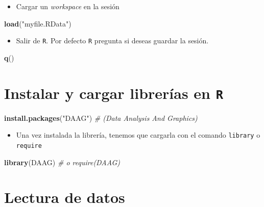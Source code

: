\documentclass[]{book}
\newenvironment{Shaded}{\begin{snugshade}}{\end{snugshade}}
\newcommand{\KeywordTok}[1]{\textcolor[rgb]{0.13,0.29,0.53}{\textbf{#1}}}
\newcommand{\StringTok}[1]{\textcolor[rgb]{0.31,0.60,0.02}{#1}}
\newcommand{\CommentTok}[1]{\textcolor[rgb]{0.56,0.35,0.01}{\textit{#1}}}
\newcommand{\NormalTok}[1]{#1}
\providecommand{\tightlist}{%
  \setlength{\itemsep}{0pt}\setlength{\parskip}{0pt}}
\begin{document}
\begin{itemize}
\tightlist
\item
  Cargar un \emph{workspace} en la sesión
\end{itemize}

\begin{Shaded}
\begin{Highlighting}[]
\KeywordTok{load}\NormalTok{(}\StringTok{"myfile.RData"}\NormalTok{) }
\end{Highlighting}
\end{Shaded}

\begin{itemize}
\tightlist
\item
  Salir de \texttt{R}. Por defecto \texttt{R} pregunta si deseas guardar
  la sesión.
\end{itemize}

\begin{Shaded}
\begin{Highlighting}[]
\KeywordTok{q}\NormalTok{()}
\end{Highlighting}
\end{Shaded}

\section{\texorpdfstring{Instalar y cargar librerías en
\texttt{R}}{Instalar y cargar librerías en R}}\label{instalar-y-cargar-librerias-en-r}

\begin{Shaded}
\begin{Highlighting}[]
\KeywordTok{install.packages}\NormalTok{(}\StringTok{"DAAG"}\NormalTok{) }\CommentTok{# (Data Analysis And Graphics)}
\end{Highlighting}
\end{Shaded}

\begin{itemize}
\tightlist
\item
  Una vez instalada la librería, tenemos que cargarla con el comando
  \texttt{library} o \texttt{require}
\end{itemize}

\begin{Shaded}
\begin{Highlighting}[]
\KeywordTok{library}\NormalTok{(DAAG) }\CommentTok{# o require(DAAG)}
\end{Highlighting}
\end{Shaded}

\section{Lectura de datos}\label{lectura-de-datos}
\end{document}
